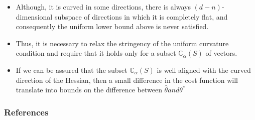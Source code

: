 \documentclass[10pt,handout,english]{beamer}
\newcommand{\C}{\mathbb{C}}
\begin{document}
\begin{frame}[allowframebreaks]
\begin{itemize}
\setlength\itemsep{0.5em}
\item Although, it is curved in some directions, there is always $(d-n)$-dimensional subspace of directions in which it is completely flat, and consequently the uniform lower bound above is never satisfied. 
\justifying
\item Thus, it is necessary to relax the stringency of the uniform curvature condition and require that it holds only for a subset $\C_{\alpha}(S)$ of vectors. 
\justifying
\item If we can be assured that the subset $\C_{\alpha}(S)$ is well aligned with the curved direction of the Hessian, then a small difference in the cost function will translate into bounds on the difference between $\hat{\theta} and \theta^{*}$
\justifying
\end{itemize}
\end{frame}


\begin{frame}[allowframebreaks]
\frametitle{References}


\end{frame}
\end{document}
